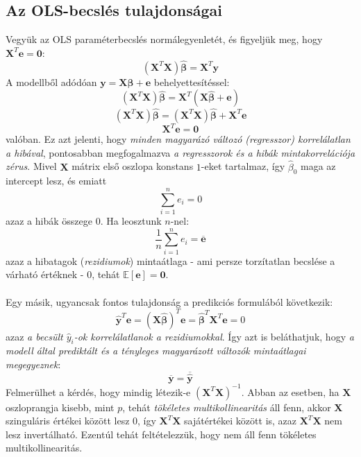 \documentclass[14p]{report}
\def\pmb{\boldsymbol}
\def\ebeta{\hat{\pmb{\beta}}}
\def\bar{\overline}
\newcounter{x}
\newcounter{y}
\newcounter{z}
\begin{document}
	\subsection{Az OLS-becslés tulajdonságai}
	Vegyük az OLS paraméterbecslés normálegyenletét, és figyeljük meg, hogy $\pmb{X}^T\pmb{e} = \pmb{0}$:
	\[
	(\pmb{X}^T\pmb{X})\ebeta = \pmb{X}^T\pmb{y}
	\]
	A modellből adódóan $\pmb{y} = \pmb{X}\ebeta + \pmb{e}$ behelyettesítéssel:
	\[
	(\pmb{X}^T\pmb{X})\ebeta = \pmb{X}^T(\pmb{X}\ebeta + \pmb{e})
	\]
	\[
	(\pmb{X}^T\pmb{X})\ebeta = (\pmb{X}^T\pmb{X})\ebeta + \pmb{X}^T\pmb{e}
	\]
	\[
	\pmb{X}^T\pmb{e} = \pmb{0}
	\]
	valóban. Ez azt jelenti, hogy \emph{minden magyarázó változó (regresszor) korrelálatlan a hibával}, pontosabban megfogalmazva \emph{a regresszorok és a hibák mintakorrelációja zérus}. Mivel $\pmb{X}$ mátrix első oszlopa konstans $1$-eket tartalmaz, így $\hat{\beta}_0$ maga az intercept lesz, és emiatt 
	\[
	\sum_{i=1}^{n}e_i = 0
	\]
	azaz a hibák összege $0$. Ha leosztunk $n$-nel:
	\[
	\frac{1}{n}\sum_{i=1}^{n}e_i = \bar{\pmb{e}}
	\]
	azaz a hibatagok (\emph{rezidiumok}) mintaátlaga - ami persze torzítatlan becslése a várható értéknek - $0$, tehát $\mathbb{E}[\pmb{e}] = \pmb{0}$.
	\\
	\\
	Egy másik, ugyancsak fontos tulajdonság a predikciós formulából következik:
	\[
	\hat{\pmb{y}}^T\pmb{e} = (\pmb{X}\ebeta)^T\pmb{e} = \ebeta^T\pmb{X}^T\pmb{e} = 0
	\]
	azaz \emph{a becsült $\hat{y}_i$-ok korrelálatlanok a rezidiumokkal}. Így azt is beláthatjuk, hogy \emph{a modell által prediktált és a tényleges magyarázott változók mintaátlagai megegyeznek}:
	\[
	\bar{\pmb{y}} = \bar{\hat{\pmb{y}}}
	\]
	Felmerülhet a kérdés, hogy mindig létezik-e $(\pmb{X}^T\pmb{X})^{-1}$. Abban az esetben, ha $\pmb{X}$ oszloprangja kisebb, mint $p$, tehát \emph{tökéletes multikollinearitás} áll fenn, akkor $\pmb{X}$ szinguláris értékei között lesz $0$, így $\pmb{X}^T\pmb{X}$ sajátértékei között is, azaz $\pmb{X}^T\pmb{X}$ nem lesz invertálható. Ezentúl tehát feltételezzük, hogy nem áll fenn tökéletes multikollinearitás.
	
\end{document}
